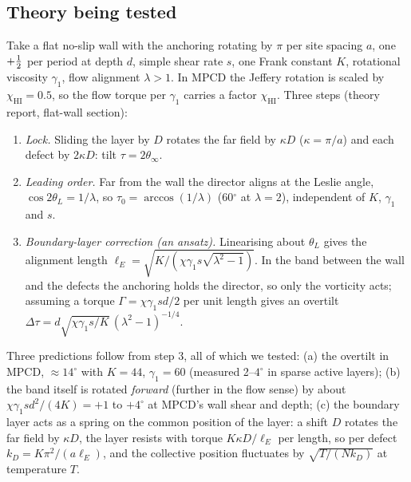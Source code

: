 \documentclass[11pt,a4paper]{article}
\begin{document}
\subsection{Theory being tested}
Take a flat no-slip wall with the anchoring rotating by $\pi$ per site spacing $a$, one $+\tfrac12$ per period at depth $d$, simple shear rate $s$, one Frank
constant $K$, rotational viscosity $\gamma_1$, flow alignment $\lambda>1$. In MPCD the Jeffery rotation is scaled by $\chi_\mathrm{HI}=0.5$, so the flow torque
per $\gamma_1$ carries a factor $\chi_\mathrm{HI}$. Three steps (theory report, flat-wall section):
\begin{enumerate}
\item \emph{Lock.} Sliding the layer by $D$ rotates the far field by $\kappa D$ ($\kappa=\pi/a$) and each defect by $2\kappa D$: tilt $\tau=2\theta_\infty$.
\item \emph{Leading order.} Far from the wall the director aligns at the Leslie angle, $\cos2\theta_L=1/\lambda$, so $\tau_0=\arccos(1/\lambda)$ (60$^\circ$ at $\lambda=2$),
independent of $K$, $\gamma_1$ and $s$.
\item \emph{Boundary-layer correction (an ansatz).} Linearising about $\theta_L$ gives the alignment length $\ell_E=\sqrt{K/(\chi\gamma_1s\sqrt{\lambda^2-1})}$. In the band
between the wall and the defects the anchoring holds the director, so only the vorticity acts; assuming a torque $\Gamma=\chi\gamma_1sd/2$ per unit
length gives an overtilt $\Delta\tau=d\sqrt{\chi\gamma_1s/K}\,(\lambda^2-1)^{-1/4}$.
\end{enumerate}
Three predictions follow from step 3, all of which we tested: (a) the overtilt in MPCD, $\approx14^\circ$ with $K=44$, $\gamma_1=60$ (measured 2--$4^\circ$ in sparse
active layers); (b) the band itself is rotated \emph{forward} (further in the flow sense) by about $\chi\gamma_1sd^2/(4K)=+1$ to $+4^\circ$ at MPCD's wall shear and depth;
(c) the boundary layer acts as a spring on the common position of the layer: a shift $D$ rotates the far field by $\kappa D$, the layer resists with torque
$K\kappa D/\ell_E$ per length, so per defect $k_D=K\pi^2/(a\ell_E)$, and the collective position fluctuates by $\sqrt{T/(Nk_D)}$ at temperature $T$.
\end{document}

